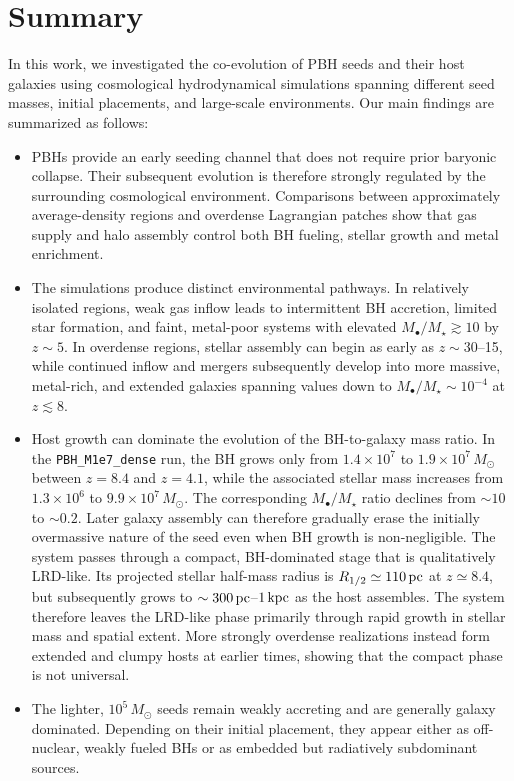 \documentclass[twocolumn,trackchanges]{aastex701}
\begin{document}
\section{Summary} \label{sec:Summary}

In this work, we investigated the co-evolution of PBH seeds and their host galaxies using cosmological hydrodynamical simulations spanning different seed masses, initial placements, and large-scale environments. Our main findings are summarized as follows:

\begin{itemize}

\item
PBHs provide an early seeding channel that does not require prior baryonic collapse. Their subsequent evolution is therefore strongly regulated by the surrounding cosmological environment. Comparisons between approximately average-density regions and overdense Lagrangian patches show that gas supply and halo assembly control both BH fueling, stellar growth and metal enrichment.

\item
The simulations produce distinct environmental pathways. In relatively isolated regions, weak gas inflow leads to intermittent BH accretion, limited star formation, and faint, metal-poor systems with elevated $M_\bullet/M_\star\gtrsim10$ by $z\sim5$. In overdense regions, stellar assembly can begin as early as $z\sim30$--15, while continued inflow and mergers subsequently develop into more massive, metal-rich, and extended galaxies spanning values down to $M_\bullet/M_\star\sim 10^{-4}$ at $z\lesssim 8$.

\item
Host growth can dominate the evolution of the BH-to-galaxy mass ratio. In the \texttt{PBH\_M1e7\_dense} run, the BH grows only from $1.4\times10^7$ to $1.9\times10^7\,M_\odot$ between $z=8.4$ and $z=4.1$, while the associated stellar mass increases from $1.3\times10^6$ to $9.9\times10^7\,M_\odot$. The corresponding $M_\bullet/M_\star$ ratio declines from $\sim10$ to $\sim0.2$. Later galaxy assembly can therefore gradually erase the initially overmassive nature of the seed even when BH growth is non-negligible.
The system passes through a compact, BH-dominated stage that is qualitatively LRD-like. Its projected stellar half-mass radius is $R_{1/2}\simeq110\,{\rm pc}$ at $z\simeq8.4$, but subsequently grows to $\sim300\,{\rm pc}$--$1\,{\rm kpc}$ as the host assembles. The system therefore leaves the LRD-like phase primarily through rapid growth in stellar mass and spatial extent. More strongly overdense realizations instead form extended and clumpy hosts at earlier times, showing that the compact phase is not universal.

\item
The lighter, $10^5\,M_\odot$ seeds remain weakly accreting and are generally galaxy dominated. Depending on their initial placement, they appear either as off-nuclear, weakly fueled BHs or as embedded but radiatively subdominant sources.

\end{itemize}
\end{document}
